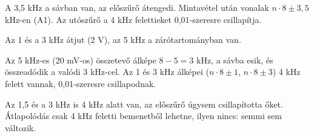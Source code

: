 A 3,5 kHz a sávban van, az előszűrő átengedi. Mintavétel után vonalak $n\cdot8\pm3{,}5$ kHz-en (A1). Az utószűrő a 4 kHz felettieket 0,01-szeresre csillapítja.

\begin{center}\end{center}

\begin{center}\end{center}

Az 1 és a 3 kHz átjut (2 V), az 5 kHz a zárótartományban van.

\begin{center}\end{center}

Az 5 kHz-es (20 mV-os) összetevő álképe $8-5=3$ kHz, a sávba esik, és összeadódik a valódi 3 kHz-cel. Az 1 és 3 kHz álképei ($n\cdot8\pm1$, $n\cdot8\pm3$) 4 kHz felett vannak, 0,01-szeresre csillapodnak.

\begin{center}\end{center}

\begin{center}\end{center}

\begin{center}\end{center}

Az 1,5 és a 3 kHz is 4 kHz alatt van, az előszűrő úgysem csillapította őket. Átlapolódás csak 4 kHz feletti bemenetből lehetne, ilyen nincs: semmi sem változik.

